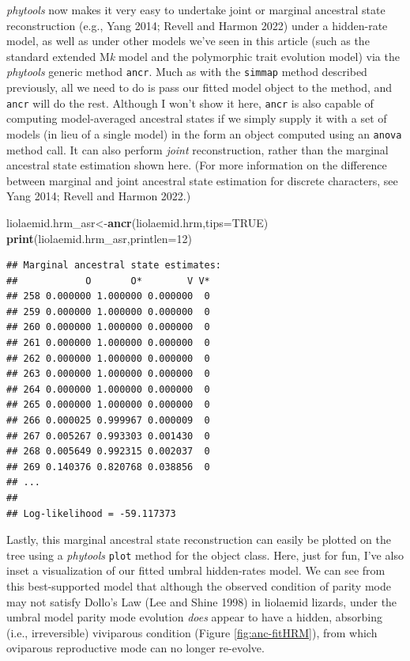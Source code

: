 \documentclass[fleqn,10pt,lineno]{wlpeerj} %
\newenvironment{Shaded}{\begin{snugshade}}{\end{snugshade}}
\newcommand{\AttributeTok}[1]{\textcolor[rgb]{0.13,0.29,0.53}{#1}}
\newcommand{\ConstantTok}[1]{\textcolor[rgb]{0.56,0.35,0.01}{#1}}
\newcommand{\DecValTok}[1]{\textcolor[rgb]{0.00,0.00,0.81}{#1}}
\newcommand{\FunctionTok}[1]{\textcolor[rgb]{0.13,0.29,0.53}{\textbf{#1}}}
\newcommand{\NormalTok}[1]{#1}
\newcommand{\OtherTok}[1]{\textcolor[rgb]{0.56,0.35,0.01}{#1}}
\begin{document}
\emph{phytools} now makes it very easy to undertake joint or marginal ancestral state reconstruction (e.g., Yang 2014; Revell and Harmon 2022) under a hidden-rate model, as well as under other models we've seen in this article (such as the standard extended M\emph{k} model and the polymorphic trait evolution model) via the \emph{phytools} generic method \texttt{ancr}. Much as with the \texttt{simmap} method described previously, all we need to do is pass our fitted model object to the method, and \texttt{ancr} will do the rest. Although I won't show it here, \texttt{ancr} is also capable of computing model-averaged ancestral states if we simply supply it with a set of models (in lieu of a single model) in the form an object computed using an \texttt{anova} method call. It can also perform \emph{joint} reconstruction, rather than the marginal ancestral state estimation shown here. (For more information on the difference between marginal and joint ancestral state estimation for discrete characters, see Yang 2014; Revell and Harmon 2022.)

\begin{Shaded}
\begin{Highlighting}[]
\NormalTok{liolaemid.hrm\_asr}\OtherTok{\textless{}{-}}\FunctionTok{ancr}\NormalTok{(liolaemid.hrm,}\AttributeTok{tips=}\ConstantTok{TRUE}\NormalTok{)}
\FunctionTok{print}\NormalTok{(liolaemid.hrm\_asr,}\AttributeTok{printlen=}\DecValTok{12}\NormalTok{)}
\end{Highlighting}
\end{Shaded}

\begin{verbatim}
## Marginal ancestral state estimates:
##            O       O*        V V*
## 258 0.000000 1.000000 0.000000  0
## 259 0.000000 1.000000 0.000000  0
## 260 0.000000 1.000000 0.000000  0
## 261 0.000000 1.000000 0.000000  0
## 262 0.000000 1.000000 0.000000  0
## 263 0.000000 1.000000 0.000000  0
## 264 0.000000 1.000000 0.000000  0
## 265 0.000000 1.000000 0.000000  0
## 266 0.000025 0.999967 0.000009  0
## 267 0.005267 0.993303 0.001430  0
## 268 0.005649 0.992315 0.002037  0
## 269 0.140376 0.820768 0.038856  0
## ...
## 
## Log-likelihood = -59.117373
\end{verbatim}

Lastly, this marginal ancestral state reconstruction can easily be plotted on the tree using a \emph{phytools} \texttt{plot} method for the object class. Here, just for fun, I've also inset a visualization of our fitted umbral hidden-rates model. We can see from this best-supported model that although the observed condition of parity mode may not satisfy Dollo's Law (Lee and Shine 1998) in liolaemid lizards, under the umbral model parity mode evolution \emph{does} appear to have a hidden, absorbing (i.e., irreversible) viviparous condition (Figure \ref{fig:anc-fitHRM}), from which oviparous reproductive mode can no longer re-evolve.
\end{document}
